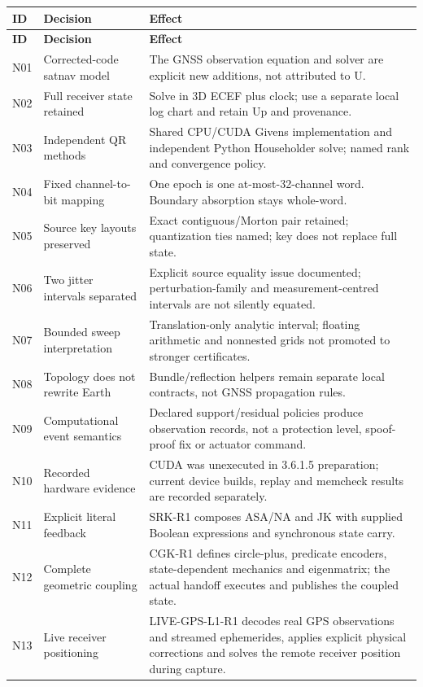 \documentclass[11pt,a4paper]{article}
\begin{document}
\begin{longtable}{@{}P{.075\textwidth}P{.28\textwidth}P{.575\textwidth}@{}}\toprule
\textbf{ID} & \textbf{Decision} & \textbf{Effect}\\\midrule
\endfirsthead
\toprule\textbf{ID} & \textbf{Decision} & \textbf{Effect}\\\midrule\endhead
N01 & Corrected-code satnav model & The GNSS observation equation and solver are explicit new additions, not attributed to U.\\
N02 & Full receiver state retained & Solve in 3D ECEF plus clock; use a separate local log chart and retain Up and provenance.\\
N03 & Independent QR methods & Shared CPU/CUDA Givens implementation and independent Python Householder solve; named rank and convergence policy.\\
N04 & Fixed channel-to-bit mapping & One epoch is one at-most-32-channel word. Boundary absorption stays whole-word.\\
N05 & Source key layouts preserved & Exact contiguous/Morton pair retained; quantization ties named; key does not replace full state.\\
N06 & Two jitter intervals separated & Explicit source equality issue documented; perturbation-family and measurement-centred intervals are not silently equated.\\
N07 & Bounded sweep interpretation & Translation-only analytic interval; floating arithmetic and nonnested grids not promoted to stronger certificates.\\
N08 & Topology does not rewrite Earth & Bundle/reflection helpers remain separate local contracts, not GNSS propagation rules.\\
N09 & Computational event semantics & Declared support/residual policies produce observation records, not a protection level, spoof-proof fix or actuator command.\\
N10 & Recorded hardware evidence & CUDA was unexecuted in 3.6.1.5 preparation; current device builds, replay and memcheck results are recorded separately.\\
N11 & Explicit literal feedback & SRK-R1 composes ASA/NA and JK with supplied Boolean expressions and synchronous state carry.\\
N12 & Complete geometric coupling & CGK-R1 defines circle-plus, predicate encoders, state-dependent mechanics and eigenmatrix; the actual handoff executes and publishes the coupled state.\\
N13 & Live receiver positioning & LIVE-GPS-L1-R1 decodes real GPS observations and streamed ephemerides, applies explicit physical corrections and solves the remote receiver position during capture.\\\bottomrule
\end{longtable}
\normalsize
\end{document}

